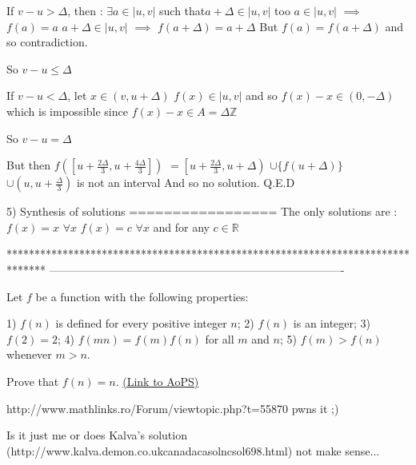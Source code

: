\begin{solution}
If $v-u>\Delta$, then :
$\exists a\in|u,v|$ such that$ a+\Delta\in|u,v|$ too
$a\in|u,v|$ $\implies$ $f(a)=a$
$a+\Delta\in|u,v|$ $\implies$ $f(a+\Delta)=a+\Delta$
But $f(a)=f(a+\Delta)$ 
and so contradiction.

So $v-u \le \Delta$

If $v-u<\Delta$, let $x\in(v,u+\Delta)$
$f(x)\in|u,v|$ and so $f(x)-x\in (0,-\Delta)$ which is impossible since $f(x)-x\in A=\Delta\mathbb Z$

So $v-u=\Delta$

But then $f\left(\left[u+\frac{2\Delta}3,u+\frac{4\Delta}3\right]\right)$ $=\left[u+\frac{2\Delta}3,u+\Delta\right)$ $\cup\{f(u+\Delta)\}$ $\cup\left(u,u+\frac{\Delta}3\right)$ is not an interval
And so no solution.
Q.E.D

5) Synthesis of solutions
=================
The only solutions are :
$f(x)=x$ $\forall x$
$f(x)=c$ $\forall x$ and for any $c\in\mathbb R$
\end{solution}
*******************************************************************************
-------------------------------------------------------------------------------

\begin{problem}
	Let $f$ be a function with the following properties:

1) $f(n)$ is defined for every positive integer $n$;
2) $f(n)$ is an integer;
3) $f(2)=2$;
4) $f(mn)=f(m)f(n)$ for all $m$ and $n$;
5) $f(m)>f(n)$ whenever $m>n$.

Prove that $f(n)=n$.
	\flushright \href{https://artofproblemsolving.com/community/c6h87616}{(Link to AoPS)}
\end{problem}



\begin{solution}
	http://www.mathlinks.ro/Forum/viewtopic.php?t=55870 pwns it ;)
\end{solution}



\begin{solution}
	Is it just me or does Kalva's solution (http://www.kalva.demon.co.uk\/canada\/casoln\/csol698.html) not make sense...
\end{solution}




